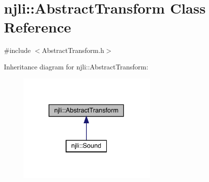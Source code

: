 \hypertarget{classnjli_1_1_abstract_transform}{}\section{njli\+:\+:Abstract\+Transform Class Reference}
\label{classnjli_1_1_abstract_transform}


{\ttfamily \#include $<$Abstract\+Transform.\+h$>$}



Inheritance diagram for njli\+:\+:Abstract\+Transform\+:\nopagebreak
\begin{figure}[H]
\begin{center}
\leavevmode
\includegraphics[width=196pt]{classnjli_1_1_abstract_transform__inherit__graph}
\end{center}
\end{figure}
